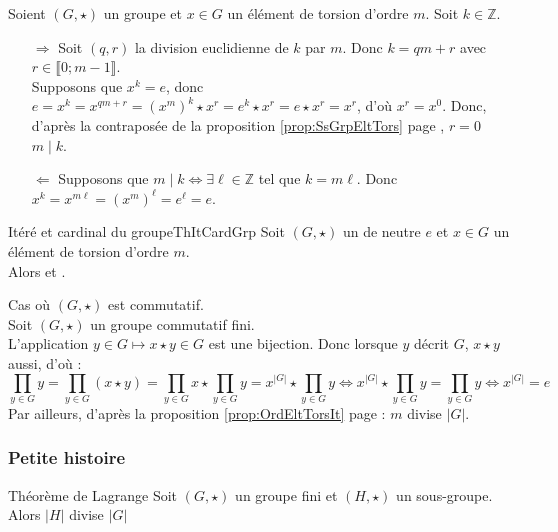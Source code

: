 \documentclass[12pt,a4paper]{report}
\begin{document}
    \begin{demo}
    Soient $(G, \star)$ un groupe et $x \in G$ un élément de torsion d'ordre $m$. Soit $k \in \mathbb{Z}$.
    \begin{itemize}
        \item[$\Rightarrow$] Soit $(q, r)$ la division euclidienne de $k$ par $m$. Donc $k = qm + r$ avec $r \in  \llbracket 0 ; m-1 \rrbracket$.\\
        Supposons que $x^k = e$, donc $e = x^k = x^{qm + r} = (x^m)^k \star x^r = e^k \star x^r = e \star x^r = x^r$, d'où $x^r = x^0$. Donc, d'après la contraposée de la proposition \ref{prop:SsGrpEltTors} page \pageref{prop:SsGrpEltTors}, $r = 0$ \ie $m \mid k$.
        \item[$\Leftarrow$] Supposons que $m \mid k \Leftrightarrow \exists \ell \in \mathbb{Z}$ tel que $k = m\ell$. Donc $x^k = x^{m\ell} = (x^m)^\ell = e^\ell = e$.
    \end{itemize}
    \end{demo}
    
   \begin{theoreme}{Itéré et cardinal du groupe}{ThItCardGrp}
    Soit $(G, \star)$ un  de neutre $e$ et $x \in G$ un élément de torsion d'ordre $m$.\\
    Alors  et .
    \end{theoreme}
    
    \begin{demo}
    Cas où $(G, \star)$ est commutatif.\\
    Soit $(G, \star)$ un groupe commutatif fini.\\
    L'application $y \in G \mapsto x \star y \in G$ est une bijection. Donc lorsque $y$ décrit $G$, $x \star y$ aussi, d'où :
    $$ \prod_{y \in G} y = \prod_{y \in G} (x \star y) = \prod_{y \in G} x \star \prod_{y \in G} y = x^{|G|} \star \prod_{y \in G} y \Leftrightarrow x^{|G|} \star \prod_{y \in G} y = \prod_{y \in G} y \Leftrightarrow x^{|G|} = e$$
    Par ailleurs, d'après la proposition \ref{prop:OrdEltTorsIt} page \pageref{prop:OrdEltTorsIt} : $m$ divise $|G|$.
    \end{demo}
    
    
    \subsubsection*{Petite histoire}
    
    \begin{theoreme}{Théorème de Lagrange}{}
    Soit $(G, \star)$ un groupe fini et $(H, \star)$ un sous-groupe. Alors $|H|$ divise $|G|$
    \end{theoreme}
    
\end{document}
